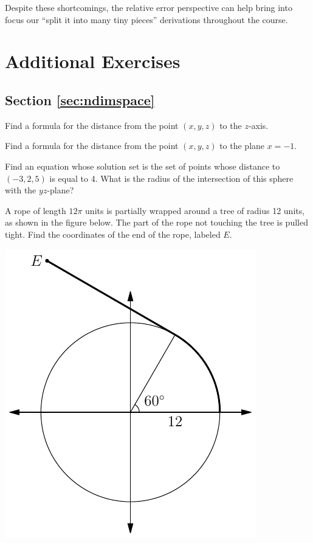 \documentclass[svgnames]{watsonbook}
\begin{document}
Despite these shortcomings, the relative error perspective can help
bring into focus our ``split it into many tiny
pieces'' derivations throughout the course. 

\newpage 

\section{Additional Exercises} \label{sec:addexer}

\subsection*{Section \ref{sec:ndimspace}}

\begin{exercise}{}{}
  Find a formula for the distance from the point $(x,y,z)$ to the
  $z$-axis. 
\end{exercise}

\begin{exercise}{}{}
  Find a formula for the distance from the point $(x,y,z)$ to the
  plane $x = -1$. 
\end{exercise}

\begin{exercise}{}{}
  Find an equation whose solution set is the set of points whose distance to $(-3,2,5)$
  is equal to 4. What is the radius of the intersection of this sphere with the $yz$-plane?
\end{exercise}

\begin{exercise}{}{}
  A rope of length $12\pi$ units is partially wrapped around a tree of radius 12 units, as shown in the figure below. The part of the rope not touching the tree is pulled tight. Find the coordinates of the end of the rope, labeled $E$. 
  \begin{center}
    \includegraphics{exercisefigures/ropetree}
  \end{center}
\end{exercise}
\end{document}
